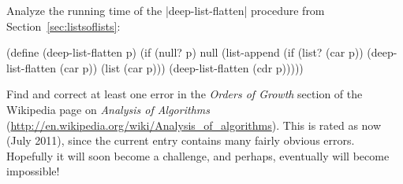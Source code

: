 \begin{schemeregion}
\beforeex
\begin{exercise}
Analyze the running time of the \scheme|deep-list-flatten| procedure from Section~\ref{sec:listsoflists}:
\begin{schemedisplay}
(define (deep-list-flatten p)
  (if (null? p) null
      (list-append (if (list? (car p))
                       (deep-list-flatten (car p))
                       (list (car p)))
                   (deep-list-flatten (cdr p)))))
\end{schemedisplay}
\solution{\LATER{}}
\end{exercise}
\afterex

\beforeex
\begin{exercise}\goldstar 
Find and correct at least one error in the \emph{Orders of Growth} section of the Wikipedia page on \emph{Analysis of Algorithms} (\url{http://en.wikipedia.org/wiki/Analysis_of_algorithms}).  This is rated as \goldstar now (July 2011), since the current entry contains many fairly obvious errors.  Hopefully it will soon become a \triplegoldstar challenge, and perhaps, eventually will become impossible!
\solution{\LATER{}}
\end{exercise}
\afterex



\end{schemeregion}

